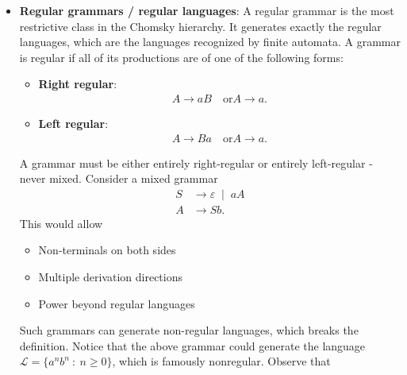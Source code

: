 \documentclass{report}
\begin{document}
\begin{itemize}
\begin{itemize}
\begin{itemize}
                        \item Most powerful grammar type
                        \item Can generate all computable languages
                    \end{itemize}
                    Recognized by turing machines. Example is an REL.
            \end{itemize}
        \item \textbf{Regular grammars / regular languages}: A regular grammar is the most restrictive class in the Chomsky hierarchy. It generates exactly the regular languages, which are the languages recognized by finite automata.
            \bigbreak \noindent 
            A grammar is regular if all of its productions are of one of the following forms:
            \begin{itemize}
                \item \textbf{Right regular}:
                    \begin{align*}
                        A \to a B \quad \text{or} A \to a
                    .\end{align*}
                \item \textbf{Left regular}:
                    \begin{align*}
                        A \to Ba \quad \text{or} A \to a
                    .\end{align*}
            \end{itemize}
            A grammar must be either entirely right-regular or entirely left-regular - never mixed.
            \bigbreak \noindent 
            Consider a mixed grammar
            \begin{align*}
                S &\to \varepsilon \; \mid \; aA \\
                A &\to Sb
            .\end{align*}
            This would allow
            \begin{itemize}
                \item Non-terminals on both sides
                \item Multiple derivation directions
                \item Power beyond regular languages
            \end{itemize}
            Such grammars can generate non-regular languages, which breaks the definition.
            \bigbreak \noindent 
            Notice that the above grammar could generate the language $\mathscr{L} = \{a^{n}b^{n} \ : \ n \geq 0\}$, which is famously nonregular. Observe that 

\end{itemize}
\end{document}
